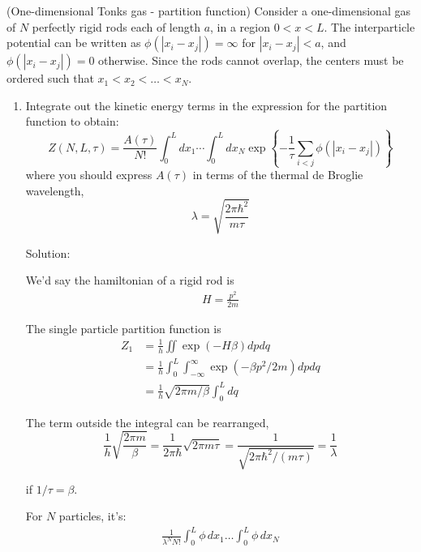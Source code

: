 \begin{homeworkProblem}
    (One-dimensional Tonks gas - partition function) Consider a one-dimensional gas of $N$
    perfectly rigid rods each of length $a$, in a region $0 < x < L$. The interparticle potential can be
    written as $\phi(|x_i - x_j|) = \infty$ for $|x_i - x_j| < a$, and $\phi(|x_i - x_j|) = 0$ otherwise. Since the rods cannot
    overlap, the centers must be ordered such that $x_1 < x_2 < \ldots < x_N$.

    \begin{enumerate}
        \item[(a)] Integrate out the kinetic energy terms in the expression for the partition function to obtain:
            \[
                Z(N, L, \tau) = \frac{A(\tau)}{N!} \int_0^L dx_1 \cdots \int_0^L dx_N \exp\left\{ -\frac{1}{\tau} \sum_{i<j} \phi(|x_i - x_j|) \right\}
            \]
            where you should express $A(\tau)$ in terms of the thermal de Broglie wavelength,
            \[
                \lambda = \sqrt{\frac{2\pi\hbar^2}{m\tau}}
            \]
            \begin{callout}{Solution:}

                We'd say the hamiltonian of a rigid rod is 
                \begin{align*}
                    H = \frac{p^{2}}{2m}
                \end{align*}

                The single particle partition function is 
                \begin{align*}
                    Z_1 &= \frac{1}{h} \iint \exp(-H \beta) dp dq \\
                        &= \frac{1}{h} \int_0^{L} \int_{-\infty}^{\infty} \exp(-\beta p^{2}/2m ) dp dq  \\
                        &= \frac{1}{h} \sqrt{2\pi m / \beta} \int_0^{L} dq
                \end{align*}

                The term outside the integral can be rearranged, 
                $$
                \frac{1}{h} \sqrt{\frac{2 \pi m}{\beta}}=\frac{1}{2 \pi \hbar} \sqrt{2 \pi m \tau}=\frac{1}{\sqrt{2 \pi \hbar^2 /(m \tau)}}=\frac{1}{\lambda}
                $$

                if $1/\tau = \beta$.

                For $N$ particles, it's:
                \begin{align*}
                    \frac{1}{\lambda^{N}N!} \int_{0}^{L} \phi\, dx_1 \dots \int_{0}^{L} \phi\, dx_N
                \end{align*}


\end{callout}
\end{enumerate}
\end{homeworkProblem}
